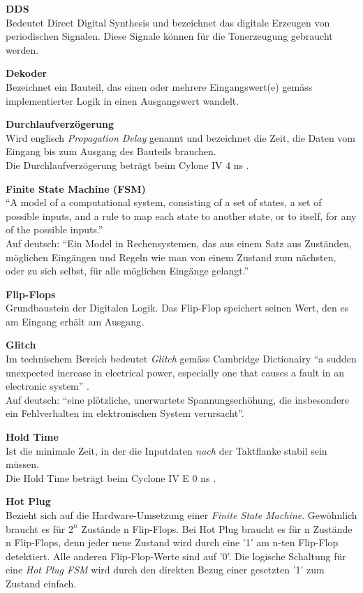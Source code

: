 \textbf{DDS}\\
Bedeutet Direct Digital Synthesis und bezeichnet das digitale Erzeugen von periodischen Signalen. Diese Signale können für die Tonerzeugung gebraucht werden.

\textbf{Dekoder}\\
Bezeichnet ein Bauteil, das einen oder mehrere Eingangswert(e) gemäss implementierter Logik in einen Ausgangswert wandelt.

\textbf{Durchlaufverzögerung}\\
Wird englisch \textit{Propagation Delay} genannt und bezeichnet die Zeit, die Daten vom Eingang bis zum Ausgang des Bauteils brauchen.\\
Die Durchlaufverzögerung beträgt beim Cylone IV 4 ns \citep{Handbook_Altera}.

\textbf{Finite State Machine (FSM)}\\
``A model of a computational system, consisting of a set of states, a set of possible inputs, and a rule to map each state to another state, or to itself, for any of the possible inputs.'' \citep{fsm}\\
Auf deutsch: ``Ein Model in Rechensystemen, das aus einem Satz aus Zuständen, möglichen Eingängen und Regeln wie man von einem Zustand zum nächsten, oder zu sich selbst, für alle möglichen Eingänge gelangt.''

\textbf{Flip-Flops}\\
Grundbaustein der Digitalen Logik. Das Flip-Flop speichert seinen Wert, den es am Eingang erhält am Ausgang.

\textbf{Glitch}\\
Im technischem Bereich bedeutet \textit{Glitch} gemäss Cambridge Dictionairy ``a sudden unexpected increase in electrical power, especially one that causes a fault in an electronic system'' \citep{dictionair}.\\
Auf deutsch: ``eine plötzliche, unerwartete Spannungserhöhung, die insbesondere ein Fehlverhalten im elektronischen System verursacht''.

\textbf{Hold Time}\\
Ist die minimale Zeit, in der die Inputdaten \textit{nach} der Taktflanke stabil sein müssen.\\
Die Hold Time beträgt beim  Cyclone IV E 0 ns \citep{Handbook_Altera}.

\textbf{Hot Plug}\\
Bezieht sich auf die Hardware-Umsetzung einer \textit{Finite State Machine}. Gewöhnlich braucht es für \begin{math} 2^n \end{math} Zustände n Flip-Flops. Bei Hot Plug braucht es für n Zustände n Flip-Flops, denn jeder neue Zustand wird durch eine '1' am n-ten Flip-Flop detektiert. Alle anderen Flip-Flop-Werte sind auf '0'. Die logische Schaltung für eine \textit{Hot Plug FSM} wird durch den direkten Bezug einer gesetzten '1' zum Zustand einfach.


